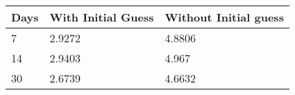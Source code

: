 \begin{tabular}{lll}
Days & With Initial Guess & Without Initial guess \\ 
\hline 
7 & 2.9272 & 4.8806 \\ 
14 & 2.9403 & 4.967 \\ 
30 & 2.6739 & 4.6632 \\ 
\hline 
\end{tabular}